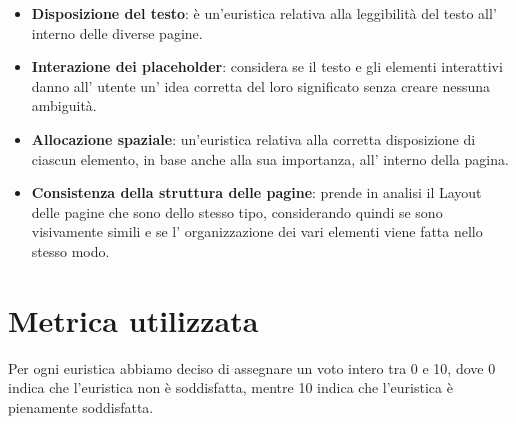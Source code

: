 \begin{itemize}
            \begin{itemize}
                \item \textbf{Disposizione del testo}: è un'euristica relativa
                alla leggibilità del testo all' interno delle diverse pagine.
                \item \textbf{Interazione dei placeholder}:  considera se il
                testo e gli elementi interattivi danno all' utente un' idea
                corretta del loro significato senza creare nessuna ambiguità.
                \item \textbf{Allocazione spaziale}: un'euristica relativa alla
                corretta disposizione di ciascun elemento, in base anche alla
                sua importanza, all' interno della pagina.
                \item \textbf{Consistenza della struttura delle pagine}: prende
                in analisi il Layout delle pagine che sono dello stesso tipo,
                considerando quindi se sono visivamente simili e se l'
                organizzazione dei vari elementi viene fatta nello stesso modo.
            \end{itemize}
        \end{itemize}
    \section{Metrica utilizzata} 
    Per ogni euristica abbiamo deciso di assegnare un voto intero tra 0 e 10,
    dove 0 indica che l'euristica non è soddisfatta, mentre 10 indica che
    l'euristica è pienamente soddisfatta.